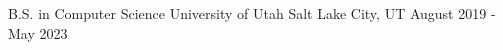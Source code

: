 


\begin{cventries}


\cventryeducation
{B.S. in Computer Science} %
{University of Utah} %
{Salt Lake City, UT} %
{August 2019 - May 2023} %
{%
}


\end{cventries}